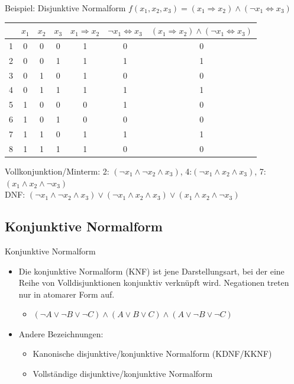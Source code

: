 \documentclass[12pt%
,xcolor=table
,aspectratio=169%
]{beamer}
\begin{document}
\begin{frame}{Beispiel: Disjunktive Normalform}
$f(x_1, x_2, x_3) = (x_1 \Rightarrow x_2) \land (\neg x_1 \Leftrightarrow x_3)$
\begin{table}[]
\begin{tabular}{|c|c|c|c||c|c|c|}
\hline
 & $x_1$ & $x_2$ & $x_3$ & $x_1 \Rightarrow x_2$ & \textbf{$\neg x_1 \Leftrightarrow x_3$} & \textbf{$(x_1 \Rightarrow x_2) \land (\neg x_1 \Leftrightarrow x_3)$} \\ \hline
1 & 0 & 0 & 0 & 1 & 0 & 0 \\ \hline
2 & 0 & 0 & 1 & 1 & 1 & 1 \\ \hline
3 & 0 & 1 & 0 & 1 & 0 & 0 \\ \hline
4 & 0 & 1 & 1 & 1 & 1 & 1 \\ \hline
5 & 1 & 0 & 0 & 0 & 1 & 0 \\ \hline
6 & 1 & 0 & 1 & 0 & 0 & 0 \\ \hline
7 & 1 & 1 & 0 & 1 & 1 & 1 \\ \hline
8 & 1 & 1 & 1 & 1 & 0 & 0 \\ \hline
\end{tabular}
\end{table}
Vollkonjunktion/Minterm: 2: $(\neg x_1 \land \neg x_2 \land x_3)$, 4:$(\neg x_1 \land x_2 \land x_3)$, 7:$(x_1 \land x_2 \land \neg x_3)$ \\
DNF: $(\neg x_1 \land \neg x_2 \land x_3) \lor (\neg x_1 \land x_2 \land x_3) \lor (x_1 \land x_2 \land \neg x_3)$
\end{frame}

\subsection{Konjunktive Normalform}
\begin{frame}{Konjunktive Normalform}
\begin{itemize}
	\item Die konjunktive Normalform (KNF) ist jene Darstellungsart, bei der eine Reihe von Volldisjunktionen konjunktiv verknüpft wird. Negationen treten nur in atomarer Form auf.
	\begin{itemize}
		\item $(\neg A \lor \neg B \lor \neg C) \land (A \lor B \lor C) \land (A \lor \neg B \lor \neg C)$ 
	\end{itemize}
	\item Andere Bezeichnungen:
	\begin{itemize}
		\item Kanonische disjunktive/konjunktive Normalform (KDNF/KKNF)
		\item Vollständige disjunktive/konjunktive Normalform
	\end{itemize}
\end{itemize}
\end{frame}
\end{document}
